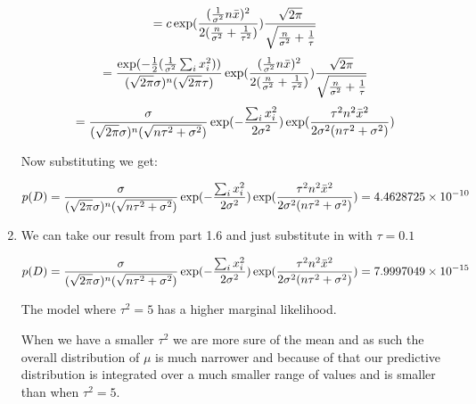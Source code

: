 \documentclass[submit]{harvardml}
\begin{document}
\begin{enumerate}
\begin{equation*}
     \end{equation*}
     \begin{equation*}
        = c \exp(\frac{(\frac{1}{\sigma^2}n\Bar{x})^2}{2(\frac{n}{\sigma^2} + \frac{1}{\tau^2})}) \frac{\sqrt{2\pi}}{\sqrt{\frac{n}{\sigma^2}+\frac{1}{\tau}}}
     \end{equation*}
     \begin{equation*}
        = \frac{\exp(-\frac{1}{2}(\frac{1}{\sigma^2}\sum_{i} x_i^2))}{(\sqrt{2\pi}\sigma)^n(\sqrt{2\pi}\tau)} \exp(\frac{(\frac{1}{\sigma^2}n\Bar{x})^2}{2(\frac{n}{\sigma^2} + \frac{1}{\tau^2})}) \frac{\sqrt{2\pi}}{\sqrt{\frac{n}{\sigma^2}+\frac{1}{\tau}}}
     \end{equation*}
     \begin{equation*}
        = \frac{\sigma}{(\sqrt{2\pi}\sigma)^n(\sqrt{n\tau^2 + \sigma^2})}\exp(-\frac{\sum_{i} x_i^2}{2\sigma^2})\exp(\frac{\tau^2 n^2\Bar{x}^2}{2\sigma^2(n\tau^2 + \sigma^2)})
     \end{equation*}
     \begin{center}
         Now substituting we get:
     \end{center}
     \begin{equation*}
        p(D) = \frac{\sigma}{(\sqrt{2\pi}\sigma)^n(\sqrt{n\tau^2 + \sigma^2})}\exp(-\frac{\sum_{i} x_i^2}{2\sigma^2})\exp(\frac{\tau^2 n^2\Bar{x}^2}{2\sigma^2(n\tau^2 + \sigma^2)}) = 4.4628725 \times 10^{-10}
     \end{equation*}
     \item
     \begin{center}
         We can take our result from part 1.6 and just substitute in with $\tau = 0.1$
     \end{center}
     \begin{equation*}
        p(D) = \frac{\sigma}{(\sqrt{2\pi}\sigma)^n(\sqrt{n\tau^2 + \sigma^2})}\exp(-\frac{\sum_{i} x_i^2}{2\sigma^2})\exp(\frac{\tau^2 n^2\Bar{x}^2}{2\sigma^2(n\tau^2 + \sigma^2)}) = 7.9997049 \times 10^{-15}
     \end{equation*}
     
     The model where $\tau^2 = 5$ has a higher marginal likelihood.
     
     When we have a smaller $\tau^2$ we are more sure of the mean and as such the overall distribution of $\mu$ is much narrower and because of that our predictive distribution is integrated over a much smaller range of values and is smaller than when $\tau^2 = 5$.
 \end{enumerate}
\end{document}
